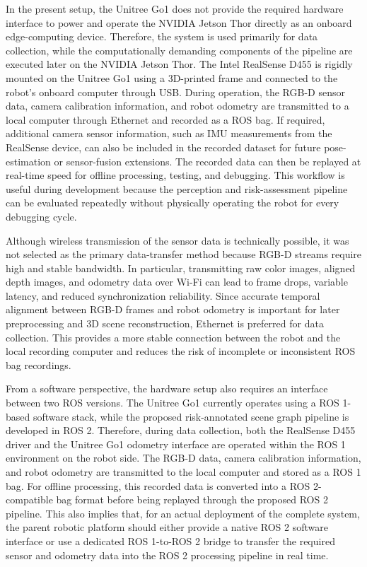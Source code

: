 In the present setup, the Unitree Go1 does not provide the required hardware interface to power and operate the NVIDIA Jetson Thor directly as an onboard edge-computing device. Therefore, the system is used primarily for data collection, while the computationally demanding components of the pipeline are executed later on the NVIDIA Jetson Thor. The Intel RealSense D455 is rigidly mounted on the Unitree Go1 using a 3D-printed frame and connected to the robot's onboard computer through USB. During operation, the RGB-D sensor data, camera calibration information, and robot odometry are transmitted to a local computer through Ethernet and recorded as a ROS bag. If required, additional camera sensor information, such as IMU measurements from the RealSense device, can also be included in the recorded dataset for future pose-estimation or sensor-fusion extensions. The recorded data can then be replayed at real-time speed for offline processing, testing, and debugging. This workflow is useful during development because the perception and risk-assessment pipeline can be evaluated repeatedly without physically operating the robot for every debugging cycle.

Although wireless transmission of the sensor data is technically possible, it was not selected as the primary data-transfer method because RGB-D streams require high and stable bandwidth. In particular, transmitting raw color images, aligned depth images, and odometry data over Wi-Fi can lead to frame drops, variable latency, and reduced synchronization reliability. Since accurate temporal alignment between RGB-D frames and robot odometry is important for later preprocessing and 3D scene reconstruction, Ethernet is preferred for data collection. This provides a more stable connection between the robot and the local recording computer and reduces the risk of incomplete or inconsistent ROS bag recordings.

From a software perspective, the hardware setup also requires an interface between two ROS versions. The Unitree Go1 currently operates using a ROS 1-based software stack, while the proposed risk-annotated scene graph pipeline is developed in ROS 2. Therefore, during data collection, both the RealSense D455 driver and the Unitree Go1 odometry interface are operated within the ROS 1 environment on the robot side. The RGB-D data, camera calibration information, and robot odometry are transmitted to the local computer and stored as a ROS 1 bag. For offline processing, this recorded data is converted into a ROS 2-compatible bag format before being replayed through the proposed ROS 2 pipeline. This also implies that, for an actual deployment of the complete system, the parent robotic platform should either provide a native ROS 2 software interface or use a dedicated ROS 1-to-ROS 2 bridge to transfer the required sensor and odometry data into the ROS 2 processing pipeline in real time.



